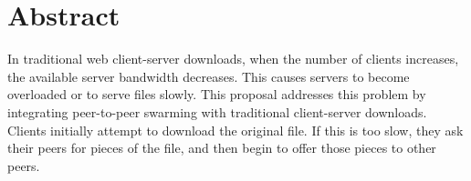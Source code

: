 \section {Abstract}
In traditional web client-server downloads, when the number of clients increases, the available server bandwidth decreases.  This causes servers to become overloaded or to serve files slowly.  This proposal addresses this problem by integrating peer-to-peer swarming with traditional client-server downloads.  Clients initially attempt to download the original file.  If this is too slow, they ask their peers for pieces of the file, and then begin to offer those pieces to other peers.
